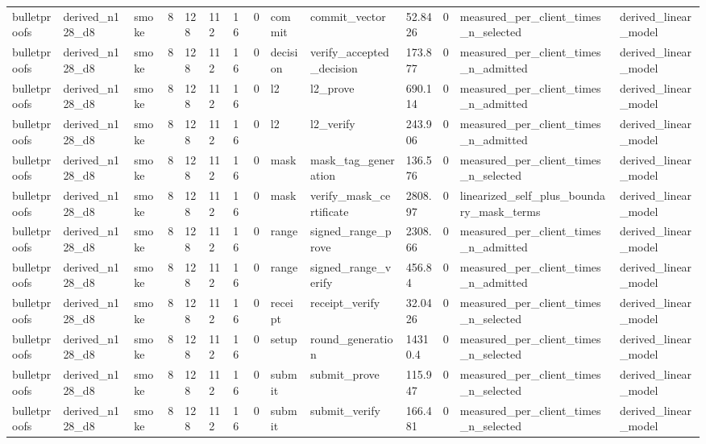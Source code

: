 \begin{table}[t]
\begin{tabular}{llllllllllllll}
bulletproofs & derived\_n128\_d8 & smoke & 8 & 128 & 112 & 16 & 0 & commit & commit\_vector & 52.8426 & 0 & measured\_per\_client\_times\_n\_selected & derived\_linear\_model \\
bulletproofs & derived\_n128\_d8 & smoke & 8 & 128 & 112 & 16 & 0 & decision & verify\_accepted\_decision & 173.877 & 0 & measured\_per\_client\_times\_n\_admitted & derived\_linear\_model \\
bulletproofs & derived\_n128\_d8 & smoke & 8 & 128 & 112 & 16 & 0 & l2 & l2\_prove & 690.114 & 0 & measured\_per\_client\_times\_n\_admitted & derived\_linear\_model \\
bulletproofs & derived\_n128\_d8 & smoke & 8 & 128 & 112 & 16 & 0 & l2 & l2\_verify & 243.906 & 0 & measured\_per\_client\_times\_n\_admitted & derived\_linear\_model \\
bulletproofs & derived\_n128\_d8 & smoke & 8 & 128 & 112 & 16 & 0 & mask & mask\_tag\_generation & 136.576 & 0 & measured\_per\_client\_times\_n\_selected & derived\_linear\_model \\
bulletproofs & derived\_n128\_d8 & smoke & 8 & 128 & 112 & 16 & 0 & mask & verify\_mask\_certificate & 2808.97 & 0 & linearized\_self\_plus\_boundary\_mask\_terms & derived\_linear\_model \\
bulletproofs & derived\_n128\_d8 & smoke & 8 & 128 & 112 & 16 & 0 & range & signed\_range\_prove & 2308.66 & 0 & measured\_per\_client\_times\_n\_admitted & derived\_linear\_model \\
bulletproofs & derived\_n128\_d8 & smoke & 8 & 128 & 112 & 16 & 0 & range & signed\_range\_verify & 456.84 & 0 & measured\_per\_client\_times\_n\_admitted & derived\_linear\_model \\
bulletproofs & derived\_n128\_d8 & smoke & 8 & 128 & 112 & 16 & 0 & receipt & receipt\_verify & 32.0426 & 0 & measured\_per\_client\_times\_n\_selected & derived\_linear\_model \\
bulletproofs & derived\_n128\_d8 & smoke & 8 & 128 & 112 & 16 & 0 & setup & round\_generation & 14310.4 & 0 & measured\_per\_client\_times\_n\_selected & derived\_linear\_model \\
bulletproofs & derived\_n128\_d8 & smoke & 8 & 128 & 112 & 16 & 0 & submit & submit\_prove & 115.947 & 0 & measured\_per\_client\_times\_n\_selected & derived\_linear\_model \\
bulletproofs & derived\_n128\_d8 & smoke & 8 & 128 & 112 & 16 & 0 & submit & submit\_verify & 166.481 & 0 & measured\_per\_client\_times\_n\_selected & derived\_linear\_model \\

\end{tabular}
\end{table}
